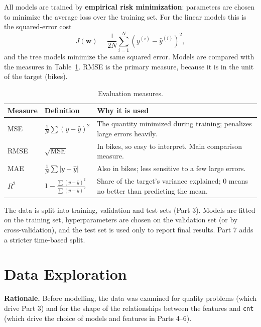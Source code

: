\documentclass[11pt]{article}
\newcommand{\code}[1]{\texttt{#1}}
\newcommand{\w}{\mathbf{w}}
\begin{document}
All models are trained by \textbf{empirical risk minimization}: parameters are chosen to minimize
the average loss over the training set. For the linear models this is the squared-error cost
\begin{equation}
  J(\w) = \frac{1}{2N}\sum_{i=1}^{N}\left(y^{(i)} - \hat{y}^{(i)}\right)^2 ,
  \label{eq:cost}
\end{equation}
and the tree models minimize the same squared error. Models are compared with the measures in
Table~\ref{tab:metrics}. RMSE is the primary measure, because it is in the unit of the target (bikes).

\begin{table}[H]
\centering
\caption{Evaluation measures.}
\label{tab:metrics}
\begin{tabularx}{\linewidth}{@{}l l X@{}}
\toprule
Measure & Definition & Why it is used \\
\midrule
MSE  & $\frac{1}{N}\sum (y-\hat{y})^2$ & The quantity minimized during training; penalizes large errors heavily. \\
RMSE & $\sqrt{\text{MSE}}$ & In bikes, so easy to interpret. Main comparison measure. \\
MAE  & $\frac{1}{N}\sum |y-\hat{y}|$ & Also in bikes; less sensitive to a few large errors. \\
$R^2$ & $1 - \frac{\sum (y-\hat{y})^2}{\sum (y-\bar{y})^2}$ & Share of the target's variance explained; 0 means no better than predicting the mean. \\
\bottomrule
\end{tabularx}
\end{table}

The data is split into training, validation and test sets (Part 3). Models are fitted on the
training set, hyperparameters are chosen on the validation set (or by cross-validation), and the
test set is used only to report final results. Part 7 adds a stricter time-based split.

\section{Data Exploration}

\textbf{Rationale.} Before modelling, the data was examined for quality problems (which drive
Part 3) and for the shape of the relationships between the features and \code{cnt} (which drive
the choice of models and features in Parts 4--6).
\end{document}
